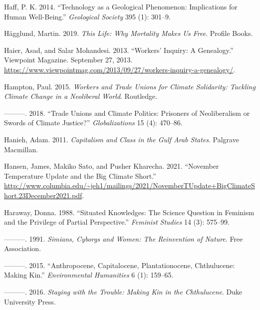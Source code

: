 \documentclass[a4paper, nobind]{templates/ociamthesis}
\newlength{\cslhangindent}
\newenvironment{CSLReferences}[2] %
 {%
  \setlength{\parindent}{0pt}
  \ifodd #1
  \let\oldpar\par
  \def\par{\hangindent=\cslhangindent\oldpar}
  \fi
  \setlength{\parskip}{1mm}
  \setlength{\baselineskip}{6mm}
 }%
 {}
\begin{document}
\begin{CSLReferences}{1}{0}
\leavevmode{}%
Haff, P. K. 2014. {``Technology as a Geological Phenomenon: Implications for Human Well-Being.''} \emph{Geological Society} 395 (1): 301--9.

\leavevmode{}%
Hägglund, Martin. 2019. \emph{This {Life}: {Why Mortality Makes Us Free}}. {Profile Books}.

\leavevmode{}%
Haier, Asad, and Salar Mohandesi. 2013. {``Workers' {Inquiry}: {A Genealogy}.''} {Viewpoint Magazine}. September 27, 2013. \url{https://www.viewpointmag.com/2013/09/27/workers-inquiry-a-genealogy/}.

\leavevmode{}%
Hampton, Paul. 2015. \emph{Workers and Trade Unions for Climate Solidarity: {Tackling} Climate Change in a Neoliberal World}. {Routledge}.

\leavevmode{}%
---------. 2018. {``Trade Unions and Climate Politics: Prisoners of Neoliberalism or Swords of Climate Justice?''} \emph{Globalizations} 15 (4): 470--86.

\leavevmode{}%
Hanieh, Adam. 2011. \emph{Capitalism and {Class} in the {Gulf Arab States}}. {Palgrave Macmillan}.

\leavevmode{}%
Hansen, James, Makiko Sato, and Pusher Kharecha. 2021. {``November {Temperature Update} and the {Big Climate Short}.''} \url{http://www.columbia.edu/~jeh1/mailings/2021/NovemberTUpdate+BigClimateShort.23December2021.pdf}.

\leavevmode{}%
Haraway, Donna. 1988. {``Situated Knowledges: {The} Science Question in Feminism and the Privilege of Partial Perspective.''} \emph{Feminist Studies} 14 (3): 575--99.

\leavevmode{}%
---------. 1991. \emph{Simians, {Cyborgs} and {Women}: {The Reinvention} of {Nature}}. {Free Association}.

\leavevmode{}%
---------. 2015. {``Anthropocene, {Capitalocene}, {Plantationocene}, {Chthulucene}: {Making Kin}.''} \emph{Environmental Humanities} 6 (1): 159--65.

\leavevmode{}%
---------. 2016. \emph{Staying with the {Trouble}: {Making Kin} in the {Chthulucene}}. {Duke University Press}.


\end{CSLReferences}
\end{document}
